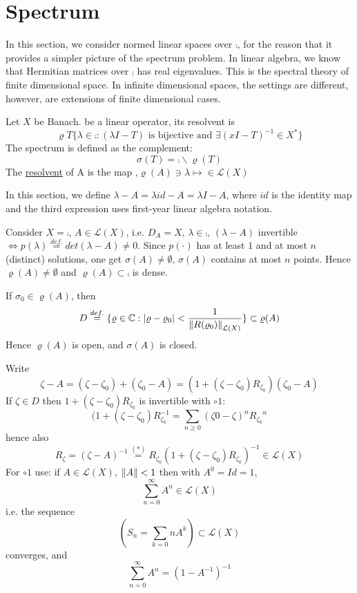 \section{Spectrum}
In this section, we consider normed linear spaces over $\comp$, for the reason that it provides a simpler picture of the spectrum problem. In linear algebra, we know that Hermitian matrices over $\comp$ has real eigenvalues. This is the spectral theory of finite dimensional space. In infinite dimensional spaces, the settings are different, however, are extensions of finite dimensional cases.

\begin{definition}\nl
	Let $X$ be Banach.  be a linear operator, its resolvent is
	$$
		\varrho{T}
		\{
		\lambda\in\comp:(\lambda I-T) \text{ is bijective and } \exists (xI-T)^{-1}\in X^*
		\}
	$$
	The spectrum is defined as the complement:
	$$
		\sigma(T)=\comp\backslash\varrho(T)
	$$
	The {\underline{resolvent}} of A is the map ,$\varrho(A)\ni\lambda\mapsto \in\mathcal{L}(X)$
\end{definition}

\begin{remark}\nl
	In this section, we define $\lambda-A=\lambda id -A=\lambda I-A$, where $id$ is the identity map and the third expression uses first-year linear algebra notation.
\end{remark}

\begin{example}
	Consider $X=\comp$, $A\in \mathcal{L}(X)$, i.e. $D_A=X$, $\lambda\in\comp$, $(\lambda-A)$ invertible $\iff p(\lambda)\stackrel{def.}{=}det(\lambda-A)\neq0$. Since  $p(\cdot)$ has at least $1$ and at most $n$ (distinct) solutions, one get $\sigma(A)\neq \emptyset$, $\sigma(A)$ contains at most $n$ points. Hence $\varrho(A)\neq\emptyset$ and $\varrho(A)\subset\comp$ is dense.
\end{example}

\begin{lemma}\nl
	If $\sigma_0\in\varrho(A)$, then
	$$D\stackrel{def.}{=}
		\{
		\varrho\in\mathbb{C}:|\varrho-\varrho_0|<\frac{1}{\left\|{R(\varrho_0)}\right\|_{\mathcal{L}(X)}}
		\}
		\subset\varrho(A)$$
	Hence $\varrho(A)$ is open, and $\sigma(A)$ is closed.
	\begin{pf}{}{}
		Write
		$$
			\zeta-A=
			( \zeta-\zeta_0)+(\zeta_0-A)=(1+(\zeta-\zeta_0)R_{\zeta_0})(\zeta_0-A)
		$$
		If $\zeta\in D$ then $1+(\zeta-\zeta_0)R_{\zeta_0}$ is invertible with $\circ{1}$:
		$$
			(1+(\zeta-\zeta_0)R_{\zeta_0}^{-1}=\sum_{n\geq0}(\zeta0-\zeta)^n {R_{\zeta_0}}^n
		$$
		hence also
		$$
			R_\zeta=(\zeta-A)^{-1}\stackrel{(*)}{=}R_{\zeta_0}(1+(\zeta-\zeta_0)R_{\zeta_0})^{-1}\in\mathcal{L}(X)
		$$
		For $\circ{1}$ use: if $A\in\mathcal{L}(X)$, $\left\|{A}\right\|<1$ then with $A^0=Id=1$,
		$$
			\sum_{n=0}^\infty A^n\in\mathcal{L}(X)
		$$
		i.e. the sequence
		$$
			\left(
			S_n=\sum_{k=0}n A^k
			\right)\subset\mathcal{L}(X)
		$$
		converges, and
		$$
			\sum_{n=0}^\infty A^n=(1-A^{-1})^{-1}
		$$
	\end{pf}
\end{lemma}

